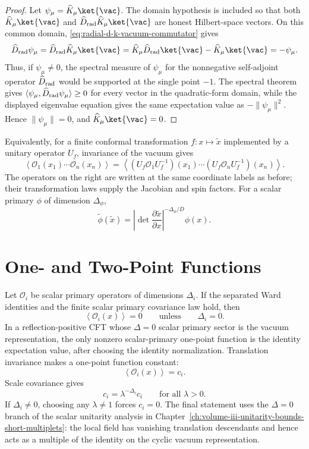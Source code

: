 \begin{proof}
Let \(\psi_\mu=\widehat K_\mu\ket{\vac}\).  The domain hypothesis is included
so that both \(\widehat K_\mu\ket{\vac}\) and
\(\widehat D_{\rm rad}\widehat K_\mu\ket{\vac}\) are honest Hilbert-space
vectors.  On this common domain,
\eqref{eq:radial-d-k-vacuum-commutator} gives
\[
  \widehat D_{\rm rad}\psi_\mu
  =
  \widehat D_{\rm rad}\widehat K_\mu\ket{\vac}
  =
  \widehat K_\mu\widehat D_{\rm rad}\ket{\vac}
  -
  \widehat K_\mu\ket{\vac}
  =
  -\psi_\mu .
\]
Thus, if \(\psi_\mu\ne0\), the spectral measure of \(\psi_\mu\) for the
nonnegative self-adjoint operator \(\widehat D_{\rm rad}\) would be supported
at the single point \(-1\).  The spectral theorem gives
\(\langle\psi_\mu,\widehat D_{\rm rad}\psi_\mu\rangle\ge0\) for every vector in
the quadratic-form domain, while the displayed eigenvalue equation gives the
same expectation value as \(-\|\psi_\mu\|^2\).  Hence
\(\|\psi_\mu\|=0\), and \(\widehat K_\mu\ket{\vac}=0\).
\end{proof}

Equivalently, for a finite conformal transformation \(f:x\mapsto \widetilde x\)
implemented by a unitary operator \(U_f\), invariance of the vacuum gives
\[
  \left\langle
    \mathcal O_1(x_1)\cdots\mathcal O_n(x_n)
  \right\rangle
  =
  \left\langle
    (U_f\mathcal O_1U_f^{-1})(x_1)\cdots
    (U_f\mathcal O_nU_f^{-1})(x_n)
  \right\rangle .
\]
The operators on the right are written at the same coordinate labels as before;
their transformation laws supply the Jacobian and spin factors.  For a scalar
primary \(\phi\) of dimension \(\Delta_\phi\),
\begin{equation}
  \widetilde\phi(\widetilde x)
  =
  \left|\det\frac{\partial\widetilde x}{\partial x}\right|^{-\Delta_\phi/D}
  \phi(x).
  \label{eq:scalar-primary-finite-transform-correlators}
\end{equation}

\section{One- and Two-Point Functions}

Let \(\mathcal O_i\) be scalar primary operators of dimensions
\(\Delta_i\).  If the separated Ward identities and the finite scalar
primary covariance law hold, then
\[
  \left\langle \mathcal O_i(x)\right\rangle=0
  \qquad\text{unless}\qquad
  \Delta_i=0.
\]
In a reflection-positive CFT whose \(\Delta=0\) scalar primary sector is the
vacuum representation, the only nonzero scalar-primary one-point function is
the identity expectation value, after choosing the identity normalization.
Translation invariance makes a one-point function constant:
\[
  \left\langle \mathcal O_i(x)\right\rangle=c_i.
\]
Scale covariance gives
\[
  c_i=\lambda^{-\Delta_i}c_i
  \qquad
  \text{for all }\lambda>0.
\]
If \(\Delta_i\ne0\), choosing any \(\lambda\ne1\) forces \(c_i=0\).  The final
statement uses the \(\Delta=0\) branch of the scalar unitarity analysis in
Chapter~\ref{ch:volume-iii-unitarity-bounds-short-multiplets}: the local field
has vanishing translation descendants and hence acts as a multiple of the
identity on the cyclic vacuum representation.

